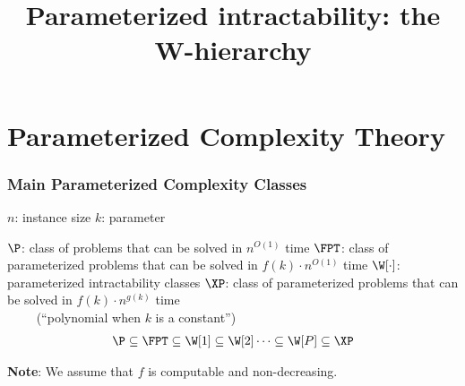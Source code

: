


\title[Parameterized intractability]
{Parameterized intractability: the W-hierarchy}

\begin{frame}
  \titlepage
\end{frame}

\lecturenotes{\maketitle}

\begin{frame}
 \tableofcontents
\end{frame}

\section{Parameterized Complexity Theory}

\begin{frame}
	\frametitle{Main Parameterized Complexity Classes}
	
	\noindent
	$n$: instance size\newline
	$k$: parameter
	
	\medskip
	\noindent
	$\P$: class of problems that can be solved in $n^{O(1)}$ time\newline
	$\FPT$: class of parameterized problems that can be solved in $f(k) \cdot n^{O(1)}$ time\newline
	$\W[\cdot]$: parameterized intractability classes\newline
	$\XP$: class of parameterized problems that can be solved in $f(k) \cdot n^{g(k)}$ time\\ $\qquad$ (``polynomial when $k$ is a constant'')
	\slides{\medskip}
	\begin{align*}
	\P \subseteq \FPT \subseteq \W[1] \subseteq \W[2] \dots \subseteq \W[P]\subseteq \XP
	\end{align*}
	
	
	\smallskip
	\noindent
	\textbf{Note}: We assume that $f$ is \alert{computable} and \alert{non-decreasing}.
	
\end{frame}


